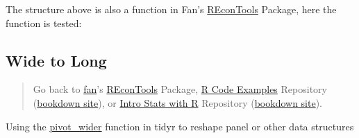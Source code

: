 \documentclass[
]{book}
\newenvironment{Shaded}{\begin{snugshade}}{\end{snugshade}}
\newcommand{\CommentTok}[1]{\textcolor[rgb]{0.56,0.35,0.01}{\textit{#1}}}
\newcommand{\FunctionTok}[1]{\textcolor[rgb]{0.00,0.00,0.00}{#1}}
\newcommand{\NormalTok}[1]{#1}
\newcommand{\OtherTok}[1]{\textcolor[rgb]{0.56,0.35,0.01}{#1}}
\newcommand{\SpecialCharTok}[1]{\textcolor[rgb]{0.00,0.00,0.00}{#1}}
\newcommand{\StringTok}[1]{\textcolor[rgb]{0.31,0.60,0.02}{#1}}
\begin{document}
The structure above is also a function in Fan's \href{https://fanwangecon.github.io/REconTools/}{REconTools} Package, here the function is tested:

\begin{Shaded}
\end{Shaded}

\hypertarget{wide-to-long}{%
\subsection{Wide to Long}\label{wide-to-long}}

\begin{quote}
Go back to \href{http://fanwangecon.github.io/}{fan}'s \href{https://fanwangecon.github.io/REconTools/}{REconTools} Package, \href{https://fanwangecon.github.io/R4Econ/}{R Code Examples} Repository (\href{https://fanwangecon.github.io/R4Econ/bookdown}{bookdown site}), or \href{https://fanwangecon.github.io/Stat4Econ/}{Intro Stats with R} Repository (\href{https://fanwangecon.github.io/Stat4Econ/bookdown}{bookdown site}).
\end{quote}

Using the \href{https://tidyr.tidyverse.org/reference/pivot_wider.html}{pivot\_wider} function in tidyr to reshape panel or other data structures
\end{document}
